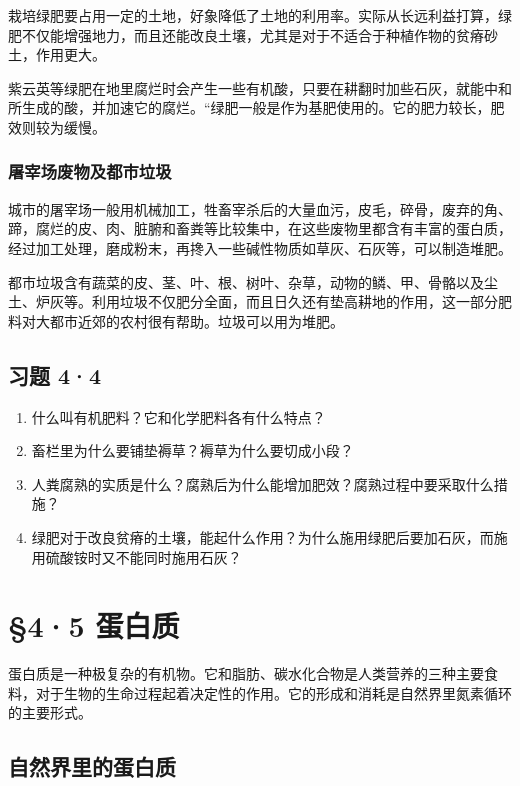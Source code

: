 栽培绿肥要占用一定的土地，好象降低了土地的利用率。实际从长远利益打算，绿肥不仅能增强地力，而且还能改良土壤，尤其是对于不适合于种植作物的贫瘠砂土，作用更大。

紫云英等绿肥在地里腐烂时会产生一些有机酸，只要在耕翻时加些石灰，就能中和所生成的酸，并加速它的腐烂。``绿肥一般是作为基肥使用的。它的肥力较长，肥效则较为缓慢。

\subsubsection{屠宰场废物及都市垃圾}

城市的屠宰场一般用机械加工，牲畜宰杀后的大量血污，皮毛，碎骨，废弃的角、蹄，腐烂的皮、肉、脏腑和畜粪等比较集中，在这些废物里都含有丰富的蛋白质，经过加工处理，磨成粉末，再搀入一些碱性物质如草灰、石灰等，可以制造堆肥。

都市垃圾含有蔬菜的皮、茎、叶、根、树叶、杂草，动物的鳞、甲、骨骼以及尘土、炉灰等。利用垃圾不仅肥分全面，而且日久还有垫高耕地的作用，这一部分肥料对大都市近郊的农村很有帮助。垃圾可以用为堆肥。

\subsection{习题 4·4}

\begin{enumerate}
\item
  什么叫有机肥料？它和化学肥料各有什么特点？
\item
  畜栏里为什么要铺垫褥草？褥草为什么要切成小段？
\item
  人粪腐熟的实质是什么？腐熟后为什么能增加肥效？腐熟过程中要采取什么措施？
\item
  绿肥对于改良贫瘠的土壤，能起什么作用？为什么施用绿肥后要加石灰，而施用硫酸铵时又不能同时施用石灰？
\end{enumerate}

\section{§4·5 蛋白质}

蛋白质是一种极复杂的有机物。它和脂肪、碳水化合物是人类营养的三种主要食料，对于生物的生命过程起着决定性的作用。它的形成和消耗是自然界里氮素循环的主要形式。

\subsection{自然界里的蛋白质}

